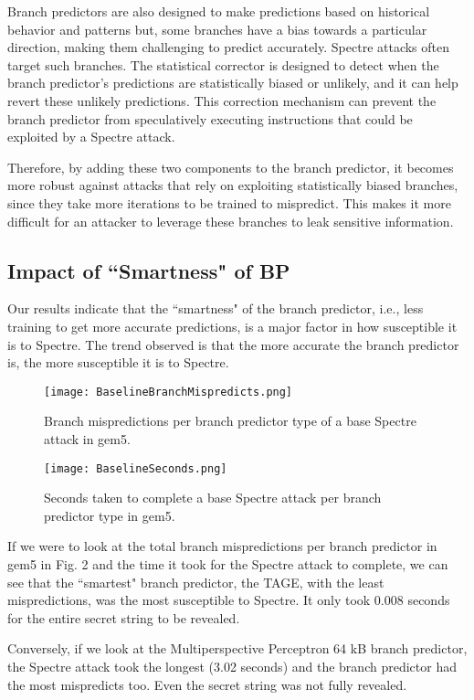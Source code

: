 \documentclass[twocolumn,showpacs,%
  nofootinbib,aps,superscriptaddress,%
  eqsecnum,prd,notitlepage,showkeys,10pt]{revtex4-1}
\begin{document}
Branch predictors are also designed to make predictions based on historical behavior and patterns but, some branches have a bias towards a particular direction, making them challenging to predict accurately. Spectre attacks often target such branches. The statistical corrector is designed to detect when the branch predictor's predictions are statistically biased or unlikely, and it can help revert these unlikely predictions. This correction mechanism can prevent the branch predictor from speculatively executing instructions that could be exploited by a Spectre attack.

Therefore, by adding these two components to the branch predictor, it becomes more robust against attacks that rely on exploiting statistically biased branches, since they take more iterations to be trained to mispredict. This makes it more difficult for an attacker to leverage these branches to leak sensitive information.

\subsection{Impact of ``Smartness" of BP}

Our results indicate that the ``smartness" of the branch predictor, i.e., less training to get more accurate predictions, is a major factor in how susceptible it is to Spectre. The trend observed is that the more accurate the branch predictor is, the more susceptible it is to Spectre.

\begin{figure}
    \centering
    \texttt{[image: BaselineBranchMispredicts.png]}
    \caption{Branch mispredictions per branch predictor type of a base Spectre attack in gem5.}
\end{figure}

\begin{figure}
    \centering
    \texttt{[image: BaselineSeconds.png]}
    \caption{Seconds taken to complete a base Spectre attack per branch predictor type in gem5.}
\end{figure}

If we were to look at the total branch mispredictions per branch predictor in gem5 in Fig. 2 and the time it took for the Spectre attack to complete, we can see that the ``smartest" branch predictor, the TAGE, with the least mispredictions, was the most susceptible to Spectre. It only took 0.008 seconds for the entire secret string to be revealed.

Conversely, if we look at the Multiperspective Perceptron 64 kB branch predictor, the Spectre attack took the longest (3.02 seconds) and the branch predictor had the most mispredicts too. Even the secret string was not fully revealed.
\end{document}
